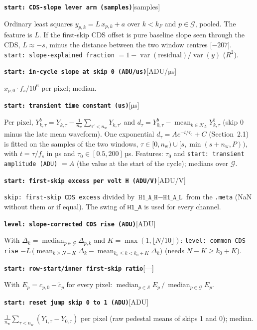 \documentclass[10pt]{article}
\newcommand{\code}[1]{\texttt{#1}}
\newcommand{\feat}[2]{\par\medskip\noindent\textbf{\texttt{#1}}\hfill{\small [#2]}\par\nopagebreak\smallskip}
\newcommand{\med}{\operatorname*{median}}
\newcommand{\mean}{\operatorname*{mean}}
\newcommand{\nw}{n_\text{w}}
\newcommand{\ko}{k_0}
\newcommand{\G}{\mathcal G}
\begin{document}
\feat{start: CDS-slope lever arm (samples)}{samples}
Ordinary least squares $y_{p,k} = L\,x_{p,k} + a$ over $k < k_F$ and $p \in \G$, pooled. The feature is $L$. If the first-skip CDS
offset is pure baseline slope seen through the CDS, $L \approx -s$, minus the distance between the two window centres [$-207$].
\code{start: slope-explained fraction} $= 1 - \operatorname{var}(\text{residual})/\operatorname{var}(y)$ ($R^2$).
\feat{start: in-cycle slope at skip 0 (ADU/us)}{ADU/µs}
$x_{p,0}\cdot f_s/10^6$ per pixel; median.
\feat{start: transient time constant (us)}{µs}
Per pixel, $Y^b_{k,\tau} = Y_{k,\tau} - \tfrac{1}{\nw}\sum_{\tau'<\nw}Y_{k,\tau'}$ and
$d_\tau = Y^b_{0,\tau} - \mean_{k\in\mathcal K_L} Y^b_{k,\tau}$ (skip 0 minus the late mean waveform). One exponential
$d_\tau = A e^{-t/\tau_0} + C$ (Section~2.1) is fitted on the samples of the two windows,
$\tau \in [0, \nw) \cup [s, \min(s+\nw, P))$, with $t = \tau/f_s$ in µs and $\tau_0 \in [0.5, 200]$\,µs. Features: $\tau_0$ and
\code{start: transient amplitude (ADU)} $= A$ (the value at the start of the cycle); medians over $\G$.
\feat{start: first-skip excess per volt H (ADU/V)}{ADU/V}
\code{skip: first-skip CDS excess} divided by $\code{H1\_A\_H} - \code{H1\_A\_L}$ from the \code{.meta} (NaN without them or if equal).
The swing of \code{H1\_A} is used for every channel.
\feat{level: slope-corrected CDS rise (ADU)}{ADU}
With $\bar\Delta_k = \med_{p\in\G}\Delta_{p,k}$ and $K = \max(1,\lfloor N/10\rfloor)$:
\code{level: common CDS rise} $- L\,\bigl(\mean_{k \ge N-K}\bar\Delta_k - \mean_{\ko \le k < \ko+K}\bar\Delta_k\bigr)$ (needs $N - K \ge \ko + K$).
\feat{start: row-start/inner first-skip ratio}{---}
With $E_p = c_{p,0} - \tilde c_p$ for every pixel: $\med_{p\in\mathcal S} E_p \,/\, \med_{p\in\G} E_p$.
\feat{start: reset jump skip 0 to 1 (ADU)}{ADU}
$\tfrac{1}{\nw}\sum_{\tau<\nw}(Y_{1,\tau} - Y_{0,\tau})$ per pixel (raw pedestal means of skips 1 and 0); median.
\end{document}
